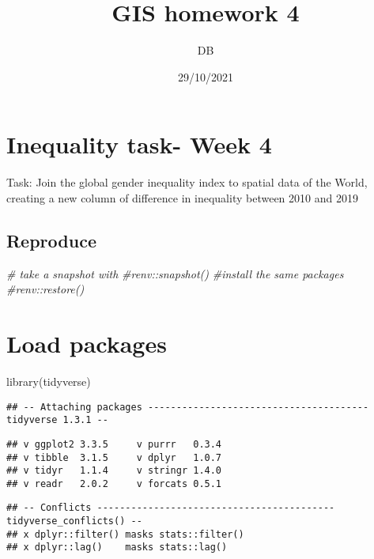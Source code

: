 \documentclass[
]{article}
\title{GIS homework 4}
\author{DB}
\date{29/10/2021}
\newenvironment{Shaded}{\begin{snugshade}}{\end{snugshade}}
\newcommand{\CommentTok}[1]{\textcolor[rgb]{0.56,0.35,0.01}{\textit{#1}}}
\newcommand{\FunctionTok}[1]{\textcolor[rgb]{0.00,0.00,0.00}{#1}}
\newcommand{\NormalTok}[1]{#1}
\begin{document}
\maketitle

\hypertarget{inequality-task--week-4}{%
\section{Inequality task- Week 4}\label{inequality-task--week-4}}

Task: Join the global gender inequality index to spatial data of the
World, creating a new column of difference in inequality between 2010
and 2019

\hypertarget{reproduce}{%
\subsection{Reproduce}\label{reproduce}}

\begin{Shaded}
\begin{Highlighting}[]
\CommentTok{\# take a snapshot with}
\CommentTok{\#renv::snapshot()}
\CommentTok{\#install the same packages}
\CommentTok{\#renv::restore()}
\end{Highlighting}
\end{Shaded}

\hypertarget{load-packages}{%
\section{Load packages}\label{load-packages}}

\begin{Shaded}
\begin{Highlighting}[]
\FunctionTok{library}\NormalTok{(tidyverse)}
\end{Highlighting}
\end{Shaded}

\begin{verbatim}
## -- Attaching packages --------------------------------------- tidyverse 1.3.1 --
\end{verbatim}

\begin{verbatim}
## v ggplot2 3.3.5     v purrr   0.3.4
## v tibble  3.1.5     v dplyr   1.0.7
## v tidyr   1.1.4     v stringr 1.4.0
## v readr   2.0.2     v forcats 0.5.1
\end{verbatim}

\begin{verbatim}
## -- Conflicts ------------------------------------------ tidyverse_conflicts() --
## x dplyr::filter() masks stats::filter()
## x dplyr::lag()    masks stats::lag()
\end{verbatim}
\end{document}
